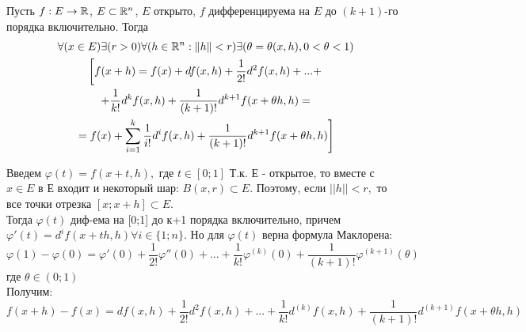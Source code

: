 \begin{teorema}
Пусть $f:E\to\mathbb{R}$, $E\subset\mathbb{R}^n$, $E$ открыто, $f$ дифференцируема на $E$ до $(k+1)$-го порядка включительно.
Тогда
\begin{multline}
\forall(x\in E)\exists(r>0)\forall(h\in\mathbb{R}^n:\|h\|<r)\exists(\theta=\theta(x,h), 0<\theta<1)
\\
\left[
	f(x+h)=f(x)+df(x,h)+\frac{1}{2!}d^2 f(x,h)+ ... + \right. \\  +\frac{1}{k!}d^k f(x,h)+\frac{1}{(k+1)!}d^{k+1} f(x+\theta h,h) = \\ \left.=
	f(x)+\sum_{i=1}^k\frac{1}{i!} d^i f(x,h) + \frac{1}{(k+1)!} d^{k+1} f(x+\theta h,h)
\right] 
\end{multline}
\end{teorema}
\dokvo
Введем $\varphi(t) = f(x+t,h),$ где $t\in[0;1]$ Т.к. Е - открытое, то вместе с $x\in E$ в Е входит и некоторый шар: $B(x,r)\subset E.$ Поэтому, если $||h|| < r,$ то все точки отрезка $[x;x+h]\subset E.$
\\
Тогда $\varphi(t)$ диф-ема на [0;1] до к+1 порядка включительно, причем $\varphi'(t) = d^i f(x+th,h)\forall i\in\{1;n\}.$ Но для $\varphi(t)$ верна формула Маклорена:
$$
\varphi(1)-\varphi(0) = \varphi'(0)+\frac{1}{2!}\varphi''(0)+...+\frac{1}{k!}\varphi^(k)(0)+\frac{1}{(k+1)!}\varphi^{(k+1)}(\theta)
$$
где $\theta\in(0;1)$
\\
Получим:
$$f(x+h)-f(x)=df(x,h)+\frac{1}{2!}d^2 f(x,h)+...+\frac{1}{k!}d^{(k)}f(x,h)+\frac{1}{(k+1)!}d^{(k+1)}f(x+\theta h,h)$$
\dokno


